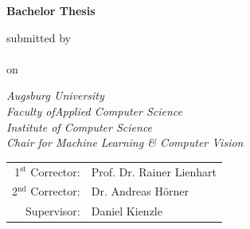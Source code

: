 \newcommand{\mail}{jan.claar@student.uni-augsburg.de}

\begin{titlepage} 
     \color{dblue}
    \begin{center} \vspace*{2cm} \Huge \textbf{\thetitle}
        
        \vspace*{1.5cm} 
        
        \color{black} \textbf{Bachelor Thesis}

        \vspace*{1cm} 

        \normalsize submitted by\\ \LARGE \theauthor\\\vspace*{0.3cm} \normalsize on \thedate

        \vspace{1.8cm} 

        \color{black} \emph{Augsburg University}\\ \emph{Faculty ofApplied Computer Science}\\ \emph{Institute of Computer Science}\\ \emph{Chair for Machine Learning \& Computer Vision}
        \vfill

        \begin{tabular}{rl}
            1$^\text{st}$ Corrector: &Prof. Dr. Rainer Lienhart\\
            2$^\text{nd}$ Corrector: &Dr. Andreas Hörner\\ 
            Supervisor: & Daniel Kienzle\\ 
        \end{tabular} 
    \end{center}

\end{titlepage}